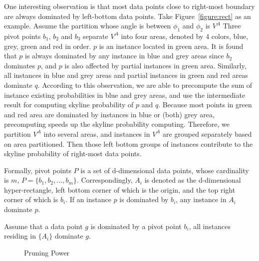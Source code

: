 One interesting observation is that most data points close to right-most boundary are always dominated by left-bottom data points. Take Figure~\ref{figure:rect} as an example. Assume the partition whose angle is between $\phi_1$ and $\phi_2$ is $V^A$ Three pivot points $b_1$, $b_2$ and $b_3$ separate $V^A$ into four areas, denoted by 4 colors, blue, grey, green and red in order. $p$ is an instance located in green area. It is found that $p$ is always dominated by any instance in blue and grey areas since $b_2$ dominates $p$, and $p$ is also affected by partial instances in green area. Similarly, all instances in blue and grey areas and partial instances in green and red areas dominate $q$. According to this observation, we are able to precompute the sum of instance existing probabilities in blue and grey areas, and use the intermediate result for computing skyline probability of $p$ and $q$. Because most points in green and red area are dominated by instances in blue or (both) grey area, precomputing speeds up the skyline probability computing. Therefore, we partition $V^A$ into several areas, and instances in $V^A$ are grouped separately based on area partitioned. Then those left bottom groups of instances contribute to the skyline probability of right-most data points.



Formally, pivot points $P$ is a set of d-dimensional data points, whose cardinality is $m$, $P = \{b_1, b_2, \dots, b_m\}$. 
Correspondingly, $A_i$ is denoted as the d-dimensional hyper-rectangle, left bottom corner of which is the origin, and the top right corner of which is $b_i$. If an instance $p$ is dominated by $b_i$, any instance in $A_i$ dominate $p$.


\begin{prop}
Assume that a data point $g$ is dominated by a pivot point $b_i$, all instances residing in $\{A_i\}$ dominate $g$.
\end{prop}

\begin{figure}[t]
\vspace{-15pt}
\centering
  \centerline{}
  \caption{Pruning Power}
  \vspace{-15pt}
  \label{figure:A1A2}
\end{figure}

